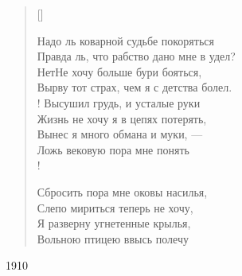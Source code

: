 \settowidth{\versewidth}{Правда ль, что рабство дано мне в удел?}
\begin{verse}[\versewidth]
\begin{altverse}
Надо ль коварной судьбе покоряться\ldotsq\\
    Правда ль, что рабство дано мне в удел?\\
Нет\ldotse Не хочу больше бури бояться,\\
	Вырву тот страх, чем я с детства болел.\\!
Высушил грудь, и усталые руки\ldotst\\
    Жизнь не хочу я в цепях потерять,\\
Вынес я много обмана и муки, ---\\
    Ложь вековую пора мне понять\ldotst\\!

Сбросить пора мне оковы насилья,\\
    Слепо мириться теперь не хочу,\\
Я разверну угнетенные крылья,\\
    Вольною птицею ввысь полечу\ldotst
\end{altverse}
\end{verse}
1910


